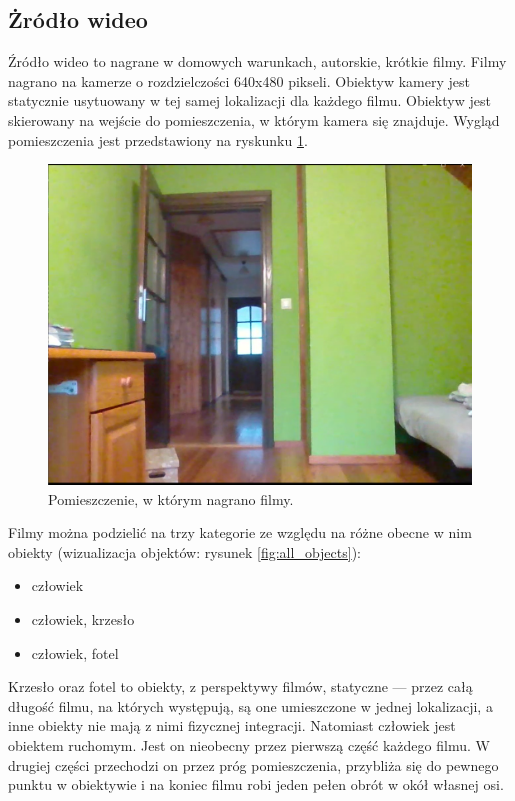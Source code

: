 \subsection{Żródło wideo}
\label{sec:zrodlo_wideo}
Źródło wideo to nagrane w domowych warunkach, autorskie, krótkie filmy. Filmy nagrano na kamerze o rozdzielczości 640x480 pikseli. Obiektyw kamery jest statycznie usytuowany w tej samej lokalizacji dla każdego filmu. Obiektyw jest skierowany na wejście do pomieszczenia, w którym kamera się znajduje. Wygląd pomieszczenia jest przedstawiony na ryskunku \ref{fig:test-dokladnosc-scena}.

\begin{figure}[H]
    \centering
    \includegraphics[width=\linewidth]{r_test_dokładności/vid_pics/1_1.png}
    \caption{Pomieszczenie, w którym nagrano filmy.}
    \label{fig:test-dokladnosc-scena}
\end{figure}


Filmy można podzielić na trzy kategorie ze względu na różne obecne w nim obiekty (wizualizacja objektów: rysunek \ref{fig:all_objects}):
\begin{itemize}
    \item człowiek
    \item człowiek, krzesło
    \item człowiek, fotel
\end{itemize}
Krzesło oraz fotel to obiekty, z perspektywy filmów, statyczne --- przez całą długość filmu, na których występują, są one umieszczone w jednej lokalizacji, a inne obiekty nie mają z nimi fizycznej integracji.
Natomiast człowiek jest obiektem ruchomym. Jest on nieobecny przez pierwszą część każdego filmu. W drugiej części przechodzi on przez próg pomieszczenia, przybliża się do pewnego punktu w obiektywie i na koniec filmu robi jeden pełen obrót w okół własnej osi. 

